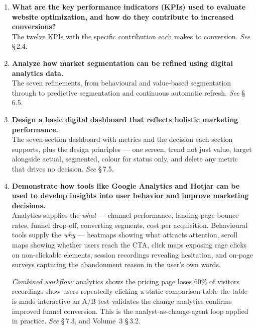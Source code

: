\begin{enumerate}[leftmargin=2.2em,itemsep=1.4ex]
      Then explain how they measure campaign success: they attribute results to
      specific campaigns and channels, allow comparison against targets and prior
      periods, expose which stage of the funnel a campaign fails at, and convert
      marketing activity into financial terms the business can act on.
      \hfill\emph{See} \S\,5.1 and \S\,2.4.

\item \textbf{What are the key performance indicators (KPIs) used to evaluate
      website optimization, and how do they contribute to increased conversions?}
      \\
      The twelve KPIs with the specific contribution each makes to conversion.
      \hfill\emph{See} \S\,2.4.

\item \textbf{Analyze how market segmentation can be refined using digital
      analytics data.} \\
      The seven refinements, from behavioural and value-based segmentation through
      to predictive segmentation and continuous automatic refresh.
      \hfill\emph{See} \S\,6.5.

\item \textbf{Design a basic digital dashboard that reflects holistic marketing
      performance.} \\
      The seven-section dashboard with metrics and the decision each section
      supports, plus the design principles --- one screen, trend not just value,
      target alongside actual, segmented, colour for status only, and delete any
      metric that drives no decision. \hfill\emph{See} \S\,7.5.

\item \textbf{Demonstrate how tools like Google Analytics and Hotjar can be used to
      develop insights into user behavior and improve marketing decisions.}
      \\
      Analytics supplies the \emph{what} --- channel performance, landing-page
      bounce rates, funnel drop-off, converting segments, cost per acquisition.
      Behavioural tools supply the \emph{why} --- heatmaps showing what attracts
      attention, scroll maps showing whether users reach the CTA, click maps
      exposing rage clicks on non-clickable elements, session recordings revealing
      hesitation, and on-page surveys capturing the abandonment reason in the
      user's own words.

      \emph{Combined workflow:} analytics shows the pricing page loses 60\% of
      visitors \ra{} recordings show users repeatedly clicking a static comparison
      table \ra{} the table is made interactive \ra{} an A/B test validates the
      change \ra{} analytics confirms improved funnel conversion. This is the
      analyst-as-change-agent loop applied in practice.
      \hfill\emph{See} \S\,7.3, and Volume~3 \S\,3.2.

\end{enumerate}

